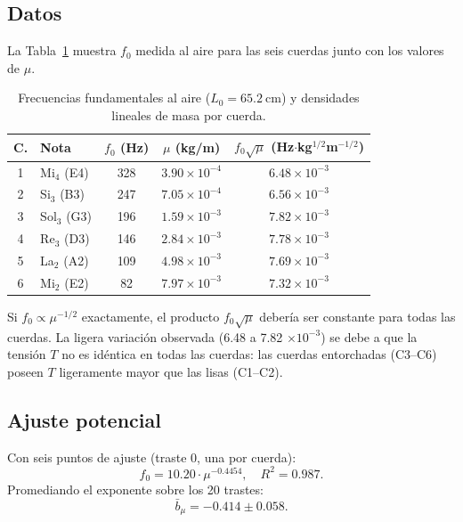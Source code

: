 \documentclass[12pt,a4paper]{article}
\begin{document}
\subsection{Datos}

La Tabla~\ref{tab:fmu} muestra $f_0$ medida al aire para las seis cuerdas
junto con los valores de $\mu$.

\begin{table}[H]
\centering
\caption{Frecuencias fundamentales al aire ($L_0 = \SI{65.2}{\cm}$) y
  densidades lineales de masa por cuerda.}
\label{tab:fmu}
\smallskip
\begin{tabular}{clccc}
\toprule
\textbf{C.} & \textbf{Nota} & $f_0$ (Hz) & $\mu$ (kg/m) & $f_0\sqrt{\mu}$ (Hz$\cdot$kg$^{1/2}$m$^{-1/2}$)\\
\midrule
1 & Mi$_4$ (E4)  & 328 & $3.90\times10^{-4}$ & $6.48\times10^{-3}$ \\
2 & Si$_3$ (B3)  & 247 & $7.05\times10^{-4}$ & $6.56\times10^{-3}$ \\
3 & Sol$_3$ (G3) & 196 & $1.59\times10^{-3}$ & $7.82\times10^{-3}$ \\
4 & Re$_3$ (D3)  & 146 & $2.84\times10^{-3}$ & $7.78\times10^{-3}$ \\
5 & La$_2$ (A2)  & 109 & $4.98\times10^{-3}$ & $7.69\times10^{-3}$ \\
6 & Mi$_2$ (E2)  &  82 & $7.97\times10^{-3}$ & $7.32\times10^{-3}$ \\
\bottomrule
\end{tabular}
\end{table}

Si $f_0 \propto \mu^{-1/2}$ exactamente, el producto $f_0\sqrt{\mu}$ debería
ser constante para todas las cuerdas. La ligera variación observada (6.48 a
7.82 $\times 10^{-3}$) se debe a que la tensión $T$ no es idéntica en todas
las cuerdas: las cuerdas entorchadas (C3–C6) poseen $T$ ligeramente mayor
que las lisas (C1–C2).

\subsection{Ajuste potencial}

Con seis puntos de ajuste (traste 0, una por cuerda):
\begin{equation}
  f_0 = 10.20 \cdot \mu^{-0.4454}, \quad R^2 = 0.987.
\end{equation}
Promediando el exponente sobre los 20 trastes:
\begin{equation}
  \bar{b}_\mu = -0.414 \pm 0.058.
\end{equation}
\end{document}
